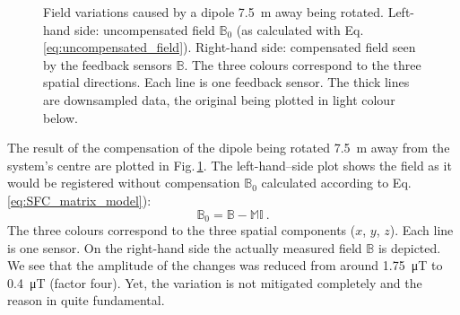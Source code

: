 \begin{figure}
  \centering
  \quad
  \caption{Field variations caused by a dipole \SI{7.5}{\meter} away being rotated. Left-hand side: uncompensated field $\mathbb{B}_0$ (as calculated with Eq.\,\ref{eq:uncompensated_field}). Right-hand side: compensated field seen by the feedback sensors $\mathbb{B}$. The three colours correspond to the three spatial directions. Each line is one feedback sensor. The thick lines are downsampled data, the original being plotted in light colour below.}
  \label{fig:prototype_compensation_time}
\end{figure}

The result of the compensation of the dipole being rotated \SI{7.5}{\meter} away from the system's centre are plotted in Fig.\,\ref{fig:prototype_compensation_time}. The left-hand--side plot shows the field as it would be registered without compensation $\mathbb{B}_0$ calculated according to Eq.\,\ref{eq:SFC_matrix_model}):
\begin{equation}
  \label{eq:uncompensated_field}
  \mathbb{B}_0 = \mathbb{B} - \mathbb{M} \mathbb{I} \ .
\end{equation}
The three colours correspond to the three spatial components ($x$, $y$, $z$). Each line is one sensor. On the right-hand side the actually measured field $\mathbb{B}$ is depicted. We see that the amplitude of the changes was reduced from around \SI{1.75}{\micro\tesla} to \SI{0.4}{\micro\tesla} (factor four). Yet, the variation is not mitigated completely and the reason in quite fundamental.

